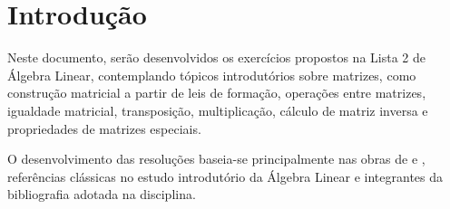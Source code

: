 \section{Introdução}

Neste documento, serão desenvolvidos os exercícios propostos na Lista 2 de
Álgebra Linear, contemplando tópicos introdutórios sobre matrizes, como
construção matricial a partir de leis de formação, operações entre matrizes,
igualdade matricial, transposição, multiplicação, cálculo de matriz inversa e
propriedades de matrizes especiais.

O desenvolvimento das resoluções baseia-se principalmente nas obras de
\citeauthor{steinbruch_linear} \cite{steinbruch_linear} e
\citeauthor{boldrini_linear} \cite{boldrini_linear}, referências clássicas no
estudo introdutório da Álgebra Linear e integrantes da bibliografia adotada na
disciplina.
